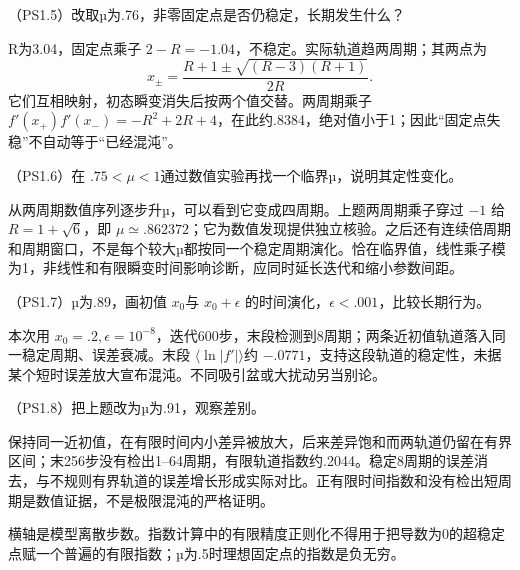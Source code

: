 \begin{exercise}\label{task:chaos-PS1-5}
（PS1.5）改取µ为.76，非零固定点是否仍稳定，长期发生什么？
\end{exercise}
\begin{solution}
R为3.04，固定点乘子 $2-R=-1.04$，不稳定。实际轨道趋两周期；其两点为
\[
 x_\pm=\frac{R+1\pm\sqrt{(R-3)(R+1)}}{2R}.
\]
它们互相映射，初态瞬变消失后按两个值交替。两周期乘子 $f'(x_+)f'(x_-)=-R^2+2R+4$，在此约.8384，绝对值小于1；因此“固定点失稳”不自动等于“已经混沌”。
\end{solution}
\begin{exercise}\label{task:chaos-PS1-6}
（PS1.6）在 $.75<\mu<1$通过数值实验再找一个临界µ，说明其定性变化。
\end{exercise}
\begin{solution}
从两周期数值序列逐步升µ，可以看到它变成四周期。上题两周期乘子穿过 $-1$ 给 $R=1+\sqrt6$，即 $\mu\simeq.862372$；它为数值发现提供独立核验。之后还有连续倍周期和周期窗口，不是每个较大µ都按同一个稳定周期演化。恰在临界值，线性乘子模为1，非线性和有限瞬变时间影响诊断，应同时延长迭代和缩小参数间距。
\end{solution}
\begin{exercise}\label{task:chaos-PS1-7}
（PS1.7）µ为.89，画初值 $x_0$与 $x_0+\epsilon$ 的时间演化，$\epsilon<.001$，比较长期行为。
\end{exercise}
\begin{solution}
本次用 $x_0=.2,\epsilon=10^{-8}$，迭代600步，末段检测到8周期；两条近初值轨道落入同一稳定周期、误差衰减。末段 $\langle\ln|f'|\rangle$约 $-.0771$，支持这段轨道的稳定性，未据某个短时误差放大宣布混沌。不同吸引盆或大扰动另当别论。
\end{solution}
\begin{exercise}\label{task:chaos-PS1-8}
（PS1.8）把上题改为µ为.91，观察差别。
\end{exercise}
\begin{solution}
保持同一近初值，在有限时间内小差异被放大，后来差异饱和而两轨道仍留在有界区间；末256步没有检出1--64周期，有限轨道指数约.2044。稳定8周期的误差消去，与不规则有界轨道的误差增长形成实际对比。正有限时间指数和没有检出短周期是数值证据，不是极限混沌的严格证明。
\begin{center}\end{center}
横轴是模型离散步数。指数计算中的有限精度正则化不得用于把导数为0的超稳定点赋一个普遍的有限指数；µ为.5时理想固定点的指数是负无穷。
\end{solution}

